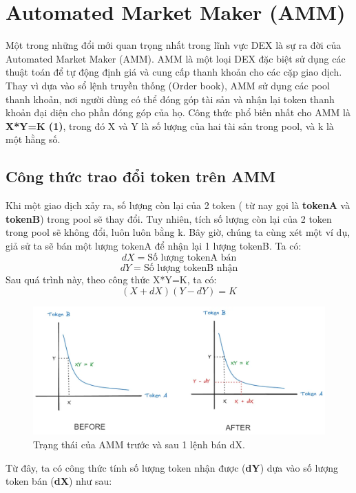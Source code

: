 \section{Automated Market Maker (AMM)}
\hspace{1cm}Một trong những đổi mới quan trọng nhất trong lĩnh vực DEX là sự ra
đời của Automated Market Maker (AMM). AMM là một loại DEX đặc biệt sử dụng các
thuật toán để tự động định giá và cung cấp thanh khoản cho các cặp giao dịch.
Thay vì dựa vào sổ lệnh truyền thống (Order book), AMM sử dụng các pool thanh
khoản, nơi người dùng có thể đóng góp tài sản và nhận lại token thanh khoản đại
diện cho phần đóng góp của họ. Công thức phổ biến nhất cho AMM là \textbf{X*Y=K
    (1)}, trong đó X và Y là số lượng của hai tài sản trong pool, và k là một
hằng
số.

\subsection{Công thức trao đổi token trên AMM}
\hspace{1cm}Khi một giao dịch xảy ra, số lượng còn lại của 2 token ( từ nay gọi
là \textbf{tokenA} và \textbf{tokenB}) trong pool sẽ thay đổi. Tuy nhiên, tích
số lượng còn lại của 2 token trong pool sẽ không đổi, luôn luôn bằng k. Bây
giờ, chúng ta cùng xét một ví dụ, giả sử ta sẽ bán một lượng tokenA để nhận lại
1 lượng tokenB. Ta có:
\[
    dX = \text{Số lượng } {\text{tokenA}} \text{ bán}
\]
\[
    dY = \text{Số lượng } {\text{tokenB}} \text{ nhận}
\]
Sau quá trình này, theo công thức X*Y=K, ta có:
\[
    (X+dX)(Y-dY) = K
\]

\begin{figure}[H]
    \begin{center}
        \includegraphics[width=1\textwidth]{figures/c1/AMM.png}
        \caption{Trạng thái của AMM trước và sau 1 lệnh bán dX.~\cite{AMM}}
        \label{fig:feature_interaction_example}
    \end{center}
\end{figure}
\hspace{-1cm}Từ đây, ta có công thức tính số lượng token nhận được
(\textbf{dY}) dựa vào số lượng token bán (\textbf{dX}) như sau:

